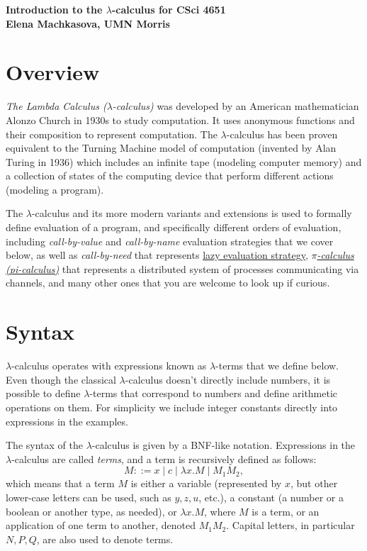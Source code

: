 \documentclass{article}
\newcommand{\lam}{\lambda}
\begin{document}
\begin{center}
{\large\bf Introduction to the $\lam$-calculus for CSci 4651}
\\ 
{\large\bf Elena Machkasova, UMN Morris}
\end{center}

\section{Overview}
\textit{The Lambda Calculus ($\lam$-calculus)} was developed by an American mathematician Alonzo Church in 1930s to study computation. 
It uses anonymous functions and their composition to represent computation. The $\lam$-calculus has been proven equivalent to 
the Turning Machine model of computation (invented by Alan Turing in 1936) which includes an infinite tape (modeling computer memory) and a collection of states of the computing device that perform different actions (modeling a program). 

The $\lam$-calculus and its more modern variants and extensions is used to formally define evaluation of a program, and 
specifically different orders of evaluation, including \textit{call-by-value} and \textit{call-by-name} evaluation strategies that we cover below, 
as well as \textit{call-by-need} that represents \href{https://en.wikipedia.org/wiki/Lazy_evaluation}{lazy evaluation strategy}, 
\href{https://en.wikipedia.org/wiki/\%CE\%A0-calculus}{\textit{$\pi$-calculus (pi-calculus)}} that represents a distributed system of processes communicating via channels, and many other ones that you are welcome to look up if curious. 

\section{Syntax}

$\lam$-calculus operates with expressions known as $\lam$-terms that we define below. 
Even though the classical $\lam$-calculus doesn't directly include numbers, it is possible to define $\lam$-terms 
that correspond to numbers and define
arithmetic operations on them. For simplicity we include integer constants directly into expressions in the examples. 

The syntax of the $\lam$-calculus is given by a BNF-like notation. Expressions in the $\lam$-calculus are called \textit{terms}, 
and a term is recursively defined as follows:
$$
M ::= x \mid c \mid \lam x. M \mid M_1 M_2,
$$
which means that a term $M$ is either a variable (represented by $x$, but other lower-case letters can be used, such as $y,z,u$, etc.), a constant (a number or a boolean or another type, as needed), or $\lam x. M$, where $M$ is a term, or an application of one term to another, denoted $M_1 M_2$. Capital letters, in particular $N, P, Q$, are also used to denote terms. 
\end{document}
